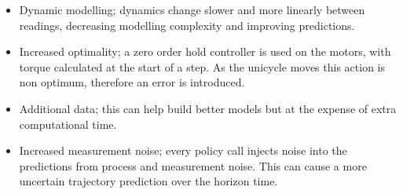 \documentclass[twoside,twocolumn,12pt]{article}
\begin{document}
\begin{itemize}
\item Dynamic modelling; dynamics change slower and more linearly between readings, decreasing modelling complexity and improving predictions.
\item Increased optimality; a zero order hold controller is used on the motors, with torque calculated at the start of a step. As the unicycle moves this action is non optimum, therefore an error is introduced.
\item Additional data; this can help build better models but at the expense of extra computational time.
\item Increased measurement noise; every policy call injects noise into the predictions from process and measurement noise. This can cause a more uncertain trajectory prediction over the horizon time.
\end{itemize}
\end{document}

